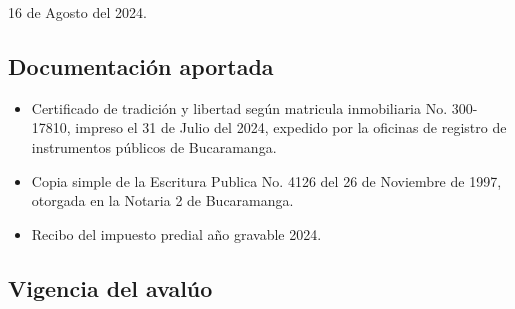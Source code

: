 \documentclass[12pt,a4paper,twoside]{article}
\begin{document}
16 de Agosto del 2024.

\subsection{Documentación aportada}

\begin{itemize}
\item Certificado de tradición y libertad según matricula inmobiliaria No. 300-17810, impreso el 31 de Julio del 2024, expedido por la oficinas de registro de instrumentos públicos de Bucaramanga.
\item Copia simple de la Escritura Publica No. 4126 del 26 de Noviembre de 1997, otorgada en la Notaria 2 de Bucaramanga.
\item Recibo del impuesto predial año gravable 2024.

\end{itemize}



\subsection{Vigencia del avalúo}
\end{document}
